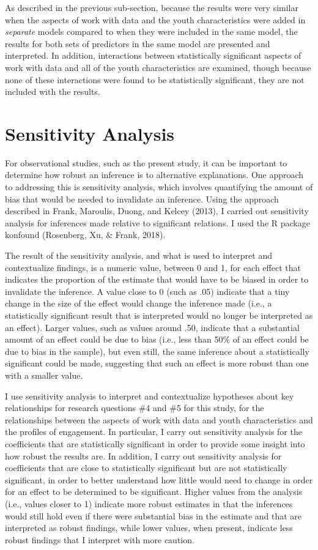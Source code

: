 \documentclass[]{book}
\theoremstyle{definition}
\theoremstyle{definition}
\theoremstyle{definition}
\theoremstyle{remark}
\begin{document}
As described in the previous sub-section, because the results were very
similar when the aspects of work with data and the youth characteristics
were added in \emph{separate} models compared to when they were included
in the same model, the results for both sets of predictors in the same
model are presented and interpreted. In addition, interactions between
statistically significant aspects of work with data and all of the youth
characteristics are examined, though because none of these interactions
were found to be statistically significant, they are not included with
the results.

\section{Sensitivity Analysis}\label{sensitivity-analysis}

For observational studies, such as the present study, it can be
important to determine how robust an inference is to alternative
explanations. One approach to addressing this is sensitivity analysis,
which involves quantifying the amount of bias that would be needed to
invalidate an inference. Using the approach described in Frank,
Maroulis, Duong, and Kelcey (2013), I carried out sensitivity analysis
for inferences made relative to significant relations. I used the R
package konfound (Rosenberg, Xu, \& Frank, 2018).

The result of the sensitivity analysis, and what is used to interpret
and contextualize findings, is a numeric value, between 0 and 1, for
each effect that indicates the proportion of the estimate that would
have to be biased in order to invalidate the inference. A value close to
0 (such as .05) indicate that a tiny change in the size of the effect
would change the inference made (i.e., a statistically significant
result that is interpreted would no longer be interpreted as an effect).
Larger values, such as values around .50, indicate that a substantial
amount of an effect could be due to bias (i.e., less than 50\% of an
effect could be due to bias in the sample), but even still, the same
inference about a statistically significant could be made, suggesting
that such an effect is more robust than one with a smaller value.

I use sensitivity analysis to interpret and contextualize hypotheses
about key relationships for research questions \#4 and \#5 for this
study, for the relationships between the aspects of work with data and
youth characteristics and the profiles of engagement. In particular, I
carry out sensitivity analysis for the coefficients that are
statistically significant in order to provide some insight into how
robust the results are. In addition, I carry out sensitivity analysis
for coefficients that are close to statistically significant but are not
statistically significant, in order to better understand how little
would need to change in order for an effect to be determined to be
significant. Higher values from the analysis (i.e., values closer to 1)
indicate more robust estimates in that the inferences would still hold
even if there were substantial bias in the estimate and that are
interpreted as robust findings, while lower values, when present,
indicate less robust findings that I interpret with more caution.
\end{document}
